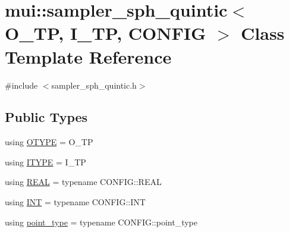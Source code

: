 \hypertarget{classmui_1_1sampler__sph__quintic}{}\section{mui\+:\+:sampler\+\_\+sph\+\_\+quintic$<$ O\+\_\+\+TP, I\+\_\+\+TP, C\+O\+N\+F\+IG $>$ Class Template Reference}
\label{classmui_1_1sampler__sph__quintic}


{\ttfamily \#include $<$sampler\+\_\+sph\+\_\+quintic.\+h$>$}

\subsection*{Public Types}
\begin{DoxyCompactItemize}
\item 
using \hyperlink{classmui_1_1sampler__sph__quintic_ae24222e54f6ab4358ad5b89a14c7af3a}{O\+T\+Y\+PE} = O\+\_\+\+TP
\item 
using \hyperlink{classmui_1_1sampler__sph__quintic_a3814b885ebc0a019391849f0cf976d7e}{I\+T\+Y\+PE} = I\+\_\+\+TP
\item 
using \hyperlink{classmui_1_1sampler__sph__quintic_ab47a0d5297b716d51c2ab6857f586103}{R\+E\+AL} = typename C\+O\+N\+F\+I\+G\+::\+R\+E\+AL
\item 
using \hyperlink{classmui_1_1sampler__sph__quintic_a03ecc5fe622f35fdf1f2123c55d19c3b}{I\+NT} = typename C\+O\+N\+F\+I\+G\+::\+I\+NT
\item 
using \hyperlink{classmui_1_1sampler__sph__quintic_a81bf989d55a1247625c7783d9326d78b}{point\+\_\+type} = typename C\+O\+N\+F\+I\+G\+::point\+\_\+type
\end{DoxyCompactItemize}
